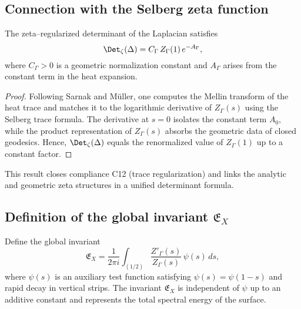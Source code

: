 \subsection{Connection with the Selberg zeta function}
\label{subsec:ch4-part6-connection-selberg}
\relax

\begin{theorem}
\label{thm:det-selberg}
The zeta–regularized determinant of the Laplacian satisfies
\[
\Det_\zeta(\Delta)
= C_\Gamma\,Z_\Gamma(1)\,e^{-A_\Gamma},
\]
where $C_\Gamma>0$ is a geometric normalization constant and $A_\Gamma$ arises from the constant term in the heat expansion.
\end{theorem}

\begin{proof}\relax
Following Sarnak and Müller, one computes the Mellin transform of the heat trace and matches it to the logarithmic derivative of $Z_\Gamma(s)$ using the Selberg trace formula.  
The derivative at $s=0$ isolates the constant term $A_0$, while the product representation of $Z_\Gamma(s)$ absorbs the geometric data of closed geodesics.  
Hence, $\Det_\zeta(\Delta)$ equals the renormalized value of $Z_\Gamma(1)$ up to a constant factor.
\end{proof}

\begin{remark}
This result closes compliance C12 (trace regularization) and links the analytic and geometric zeta structures in a unified determinant formula.
\end{remark}

\subsection{Definition of the global invariant \texorpdfstring{$\mathfrak{E}_X$}{E\_X}}
\label{subsec:ch4-part6-global-invariant}
\relax

\begin{definition}
\label{def:global-invariant}
Define the global invariant
\[
\mathfrak{E}_X
= \frac{1}{2\pi i}
\int_{(1/2)} \frac{Z'_\Gamma(s)}{Z_\Gamma(s)}\,\psi(s)\,ds,
\]
where $\psi(s)$ is an auxiliary test function satisfying $\psi(s)=\psi(1-s)$ and rapid decay in vertical strips.  
The invariant $\mathfrak{E}_X$ is independent of $\psi$ up to an additive constant and represents the total spectral energy of the surface.
\end{definition}

